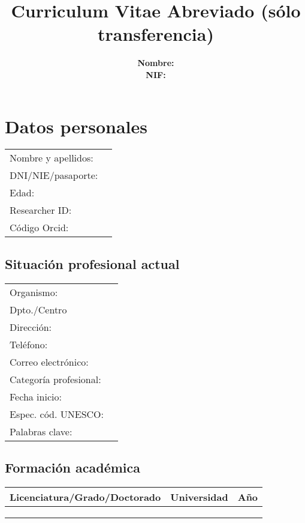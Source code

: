\documentclass[a4paper]{article}
\title{Curriculum Vitae Abreviado (sólo transferencia)}
\author{
  \begin{tabular}{ll}
    \textbf{Nombre:} &  \\
    \textbf{NIF:} & 
  \end{tabular}
}
\begin{document}
\def\normalfont{\sffamily}
\sffamily
\maketitle

\section{Datos personales}

\begin{tabular}{ll}
  Nombre y apellidos: &   \\
  DNI/NIE/pasaporte: &  \\
  Edad: &  \\
  Researcher ID: &  \\
  Código Orcid: & 
\end{tabular}

\subsection{Situación profesional actual}

\begin{tabular}{ll}
  Organismo: &  \\
  Dpto./Centro &  \\
  Dirección: &  \\
  Teléfono: &  \\
  Correo electrónico: &  \\
  Categoría profesional: &  \\
  Fecha inicio: &  \\
  Espec. cód. UNESCO: &  \\
  Palabras clave: & 
\end{tabular}

\subsection{Formación académica}

\begin{tabular}{lll}
  Licenciatura/Grado/Doctorado & Universidad & Año \\
  \hline
   &  &  \\
   &  &  \\
   &  & 
\end{tabular}
\end{document}
